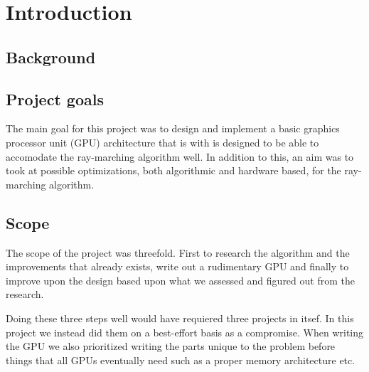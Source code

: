 \chapter{Introduction} 
	
	\section{Background}


	
	\section{Project goals}
		
		The main goal for this project was to design and implement a basic
		graphics processor unit (GPU) architecture that is with is designed to
		be able to accomodate the ray-marching algorithm well. In addition to
		this, an aim was to took at possible optimizations, both algorithmic
		and hardware based, for the ray-marching algorithm.
		
	\section{Scope}
		
		The scope of the project was threefold. First to research the algorithm and
		the improvements that already exists, write out a rudimentary GPU and
		finally to improve upon the design based upon what we assessed and figured
		out from the research.

		Doing these three steps well would have requiered three projects in itsef.
		In this project we instead did them on a best-effort basis as a compromise.
		When writing the GPU we also prioritized writing the parts unique to the
		problem before things that all GPUs eventually need such as a proper memory
		architecture etc.
